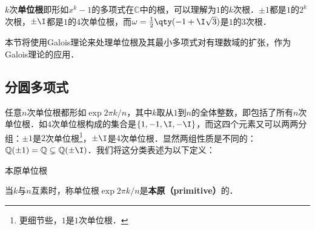 



$k$次\textbf{单位根}即形如$x^k-1$的多项式在$\mathbb{C}$中的根，可以理解为$1$的$k$次根．$\pm 1$都是$1$的$2^k$次根，$\pm \I$都是$1$的$4$次单位根，而$\omega=\frac{1}{2}\qty(-1+\I\sqrt{3})$是$1$的$3$次根．

本节将使用Galois理论来处理单位根及其最小多项式对有理数域的扩张，作为Galois理论的应用．


\subsection{分圆多项式}

任意$n$次单位根都形如$\exp{2\pi k/n}$，其中$k$取从$1$到$n$的全体整数，即包括了所有$n$次单位根．如$4$次单位根构成的集合是$\{1, -1, \I, -\I\}$，而这四个元素又可以两两分组：$\pm 1$是$2$次单位根\footnote{更细节些，$1$是$1$次单位根．}，$\pm \I$是$4$次单位根．显然两组性质是不同的：$\mathbb{Q}(\pm 1)=\mathbb{Q}\subsetneq \mathbb{Q}(\pm\I)$．我们将这分类表述为以下定义：

\begin{definition}{本原单位根}

当$k$与$n$互素时，称单位根$\exp{2\pi k/n}$是\textbf{本原（primitive）}的．

\end{definition}


















